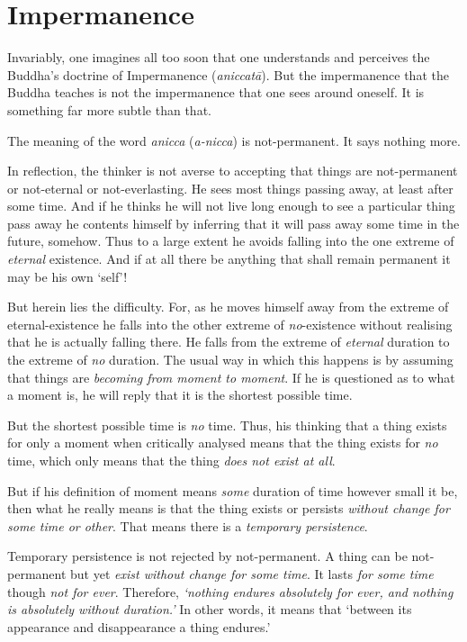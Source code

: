 \chapter{Impermanence}

Invariably, one imagines all too soon that one understands and perceives the Buddha's doctrine of Impermanence (\textit{aniccatā}). But the impermanence that the Buddha teaches is not the impermanence that one sees around oneself. It is something far more subtle than that.

The meaning of the word \textit{anicca} (\textit{a-nicca}) is not-permanent. It says nothing more.

In reflection, the thinker is not averse to accepting that things are not-permanent or not-eternal or not-everlasting. He sees most things passing away, at least after some time. And if he thinks he will not live long enough to see a particular thing pass away he contents himself by inferring that it will pass away some time in the future, somehow. Thus to a large extent he avoids falling into the one extreme of \emph{eternal} existence. And if at all there be anything that shall remain permanent it may be his own `self'!

But herein lies the difficulty. For, as he moves himself away from the extreme of eternal-existence he falls into the other extreme of \emph{no}-existence without realising that he is actually falling there. He falls from the extreme of \emph{eternal} duration to the extreme of \emph{no} duration. The usual way in which this happens is by assuming that things are \emph{becoming from moment to moment}. If he is questioned as to what a moment is, he will reply that it is the shortest possible time.

But the shortest possible time is \emph{no} time. Thus, his thinking that a thing exists for only a moment when critically analysed means that the thing exists for \emph{no} time, which only means that the thing \emph{does not exist at all}.

But if his definition of moment means \emph{some} duration of time however small it be, then what he really means is that the thing exists or persists \emph{without change for some time or other}. That means there is a \emph{temporary persistence}.

Temporary persistence is not rejected by not-permanent. A thing can be not-permanent but yet \emph{exist without change for some time}. It lasts \emph{for some time} though \emph{not for ever}. Therefore, \emph{`nothing endures absolutely for ever, and nothing is absolutely without duration.'} In other words, it means that `between its appearance and disappearance a thing endures.'

